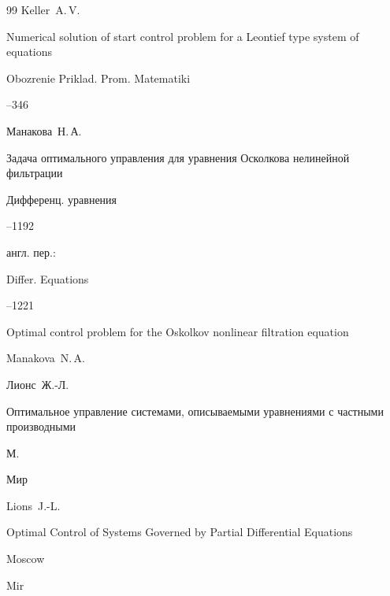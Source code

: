 \begin{thebibliography}{99}
\by Keller~A.\,V.

\paper Numerical solution of  start control problem for a  Leontief type system of equations 

\jour Obozrenie Priklad. Prom. Matematiki




--346






\by Манакова~Н.\,А.

\paper Задача оптимального управления для уравнения Осколкова нелинейной фильтрации

\jour Дифференц. уравнения




--1192

\transl англ. пер.:~

\jour Differ. Equations



--1221


\paper Optimal control problem for the Oskolkov nonlinear filtration equation

\by  Manakova~N.\,A.






\by Лионс~Ж.-Л.

\book Оптимальное управление системами, описываемыми уравнениями с частными производными

\publaddr М.

\publ Мир



\misctransl

\by Lions~J.-L.

\book Optimal Control of Systems Governed by Partial Differential Equations

\publaddr Moscow

\publ Mir






\end{thebibliography}
